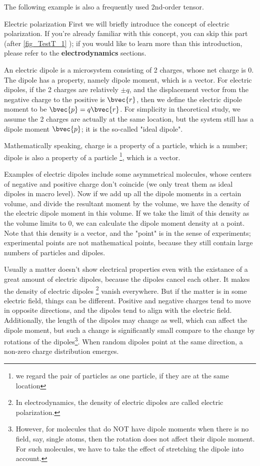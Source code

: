 The following example is also a frequently used 2nd-order tensor. 

\begin{example}{Electric polarization}
First we will briefly introduce the concept of electric polarization. If you're already familiar with this concept, you can skip this part (after \autoref{fig_TestT_1} ); if you would like to learn more than this introduction, please refer to the \textbf{electrodynamics} sections. 

An electric dipole is a microsystem consisting of 2 charges, whose net charge is 0. The dipole has a property, namely dipole moment, which is a vector. For electric dipoles, if the 2 charges are relatively $\pm q$, and the displacement vector from the negative charge to the positive is $\bvec{r}$, then we define the electric dipole moment to be $\bvec{p}=q\bvec{r}$. For simplicity in theoretical study, we assume the 2 charges are actually at the same location, but the system still has a dipole moment $\bvec{p}$; it is the so-called "ideal dipole". 

Mathematically speaking, charge is a property of a particle, which is a number; dipole is also a property of a particle \footnote{we regard the pair of particles as one particle, if they are at the same location}, which is a vector. 

Examples of electric dipoles include some asymmetrical molecules, whose centers of negative and positive charge don't coincide (we only treat them as ideal dipoles in macro level). Now if we add up all the dipole moments in a certain volume, and divide the resultant moment by the volume, we have the density of the electric dipole moment in this volume. If we take the limit of this density as the volume limits to 0, we can calculate the dipole moment density at a point. Note that this density is a vector, and the "point" is in the sense of experiments; experimental points are not mathematical points, because they still contain large numbers of particles and dipoles. 

Usually a matter doesn't show electrical properties even with the existance of a great amount of electric dipoles, because the dipoles cancel each other. It makes the density of electric dipoles \footnote{In electrodynamics, the density of electric dipoles are called electric polarization. } vanish everywhere. But if the matter is in some electric field, things can be different. Positive and negative charges tend to move in opposite directions, and the dipoles tend to align with the electric field. Additionally, the length of the dipoles may change as well, which can affect the dipole moment, but such a change is significantly small compare to the change by rotations of the dipoles\footnote{However, for molecules that do NOT have dipole moments when there is no field, say, single atoms, then the rotation does not affect their dipole moment. For such molecules, we have to take the effect of stretching the dipole into account. }. When random dipoles point at the same direction, a non-zero charge distribution emerges. 





\end{example}
